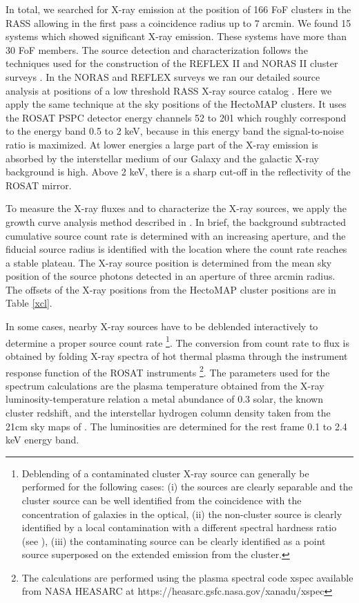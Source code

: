 \documentclass[iop, apj]{emulateapj}
\begin{document}
In total, we searched for X-ray emission 
 at the position of 166 FoF clusters in the RASS allowing 
 in the first pass a coincidence radius up to 7 arcmin. 
We found 15 systems which showed significant X-ray emission.
These systems have more than 30 FoF members. 
The source detection and characterization follows 
 the techniques used for the construction of 
 the REFLEX II and NORAS II cluster surveys
 \citep{Bohringer13, Bohringer17, Chon12}. 
In the NORAS and REFLEX surveys 
 we ran our detailed source analysis at positions of a low threshold RASS X-ray source catalog \citep{Voges99}. 
Here we apply the same technique at the sky positions of the HectoMAP clusters. 
It uses the ROSAT PSPC detector energy channels 52 to 201 
 which roughly correspond to the energy band 0.5 to 2 keV, 
 because in this energy band the signal-to-noise ratio is maximized. 
At lower energies a large part of the X-ray emission is absorbed 
 by the interstellar medium of our Galaxy and the galactic X-ray background is high. 
Above 2 keV, 
 there is a sharp cut-off in the reflectivity of the ROSAT mirror.

To measure the X-ray fluxes and to characterize the X-ray sources,
 we apply the growth curve analysis method described in \citet{Bohringer00}.
In brief, the background subtracted cumulative source count rate 
 is determined with an increasing aperture, 
 and the fiducial source radius is identified with the location 
 where the count rate reaches a stable plateau. 
The X-ray source position is determined from
 the mean sky position of the source photons detected in an aperture of three arcmin radius. 
The offsets of the X-ray positions from the HectoMAP cluster positions are in Table \ref{xcl}.
 
In some cases, 
 nearby X-ray sources have to be deblended interactively to determine
 a proper source count rate
 \footnote{Deblending of a contaminated cluster X-ray source 
 can generally be performed for the following cases: 
 (i) the sources are clearly separable and the cluster source 
  can be well identified from the coincidence with the concentration of galaxies in the optical,
 (ii) the non-cluster source is clearly identified by a local contamination with 
  a different spectral hardness ratio (see \citealp{Chon12}), 
 (iii) the contaminating source can be clearly identified as 
 a point source superposed on the extended emission from the cluster.}.
The conversion from count rate to flux
 is obtained by folding X-ray spectra of hot thermal plasma through
 the instrument response function of the ROSAT instruments
 \footnote{The calculations are performed using the plasma spectral code
 xspec available from NASA HEASARC at https://heasarc.gsfc.nasa.gov/xanadu/xspec}. 
The parameters used for the spectrum calculations are the plasma temperature 
 obtained from the X-ray luminosity-temperature relation \citep{Bohringer12}
 a metal abundance of 0.3 solar, the known cluster redshift, 
 and the interstellar hydrogen column density taken from the 21cm sky maps of \citet{Dickey90}. 
The luminosities are determined for the rest frame 0.1 to 2.4 keV energy band.
\end{document}
